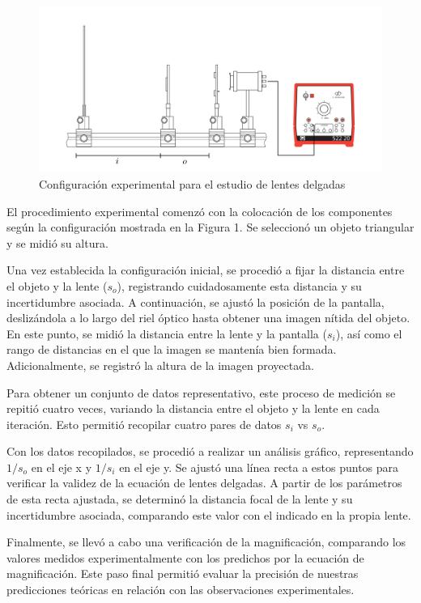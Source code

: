 \documentclass[twocolumn,a4paper,11pt]{scrartcl}
\begin{document}
\begin{figure}[h]
    \centering
    \includegraphics[width=0.8\linewidth]{montaje_experimental.png}
    \caption{Configuración experimental para el estudio de lentes delgadas}
    \label{fig:setup}
\end{figure}

El procedimiento experimental comenzó con la colocación de los componentes según la configuración mostrada en la Figura 1. Se seleccionó un objeto triangular y se midió su altura.

Una vez establecida la configuración inicial, se procedió a fijar la distancia entre el objeto y la lente ($s_o$), registrando cuidadosamente esta distancia y su incertidumbre asociada. A continuación, se ajustó la posición de la pantalla, deslizándola a lo largo del riel óptico hasta obtener una imagen nítida del objeto. En este punto, se midió la distancia entre la lente y la pantalla ($s_i$), así como el rango de distancias en el que la imagen se mantenía bien formada. Adicionalmente, se registró la altura de la imagen proyectada.

Para obtener un conjunto de datos representativo, este proceso de medición se repitió cuatro veces, variando la distancia entre el objeto y la lente en cada iteración. Esto permitió recopilar cuatro pares de datos $s_i$ vs $s_o$.

Con los datos recopilados, se procedió a realizar un análisis gráfico, representando $1/s_o$ en el eje x y $1/s_i$ en el eje y. Se ajustó una línea recta a estos puntos para verificar la validez de la ecuación de lentes delgadas. A partir de los parámetros de esta recta ajustada, se determinó la distancia focal de la lente y su incertidumbre asociada, comparando este valor con el indicado en la propia lente.

Finalmente, se llevó a cabo una verificación de la magnificación, comparando los valores medidos experimentalmente con los predichos por la ecuación de magnificación. Este paso final permitió evaluar la precisión de nuestras predicciones teóricas en relación con las observaciones experimentales.
\end{document}
